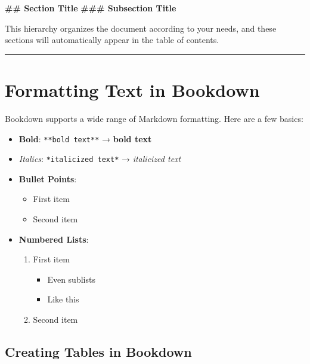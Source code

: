 \documentclass[
]{book}
\newenvironment{Shaded}{\begin{snugshade}}{\end{snugshade}}
\newcommand{\FunctionTok}[1]{\textcolor[rgb]{0.13,0.29,0.53}{\textbf{#1}}}
\providecommand{\tightlist}{%
  \setlength{\itemsep}{0pt}\setlength{\parskip}{0pt}}
\theoremstyle{definition}
\theoremstyle{definition}
\theoremstyle{definition}
\theoremstyle{definition}
\theoremstyle{remark}
\begin{document}
\begin{Shaded}
\begin{Highlighting}[]
\FunctionTok{\#\# Section Title}
\FunctionTok{\#\#\# Subsection Title}
\end{Highlighting}
\end{Shaded}

This hierarchy organizes the document according to your needs, and these sections will automatically appear in the table of contents.

\begin{center}\rule{0.5\linewidth}{0.5pt}\end{center}

\section{Formatting Text in Bookdown}\label{formatting-text-in-bookdown}

Bookdown supports a wide range of Markdown formatting. Here are a few basics:

\begin{itemize}
\tightlist
\item
  \textbf{Bold}: \texttt{**bold\ text**} → \textbf{bold text}
\item
  \emph{Italics}: \texttt{*italicized\ text*} → \emph{italicized text}
\item
  \textbf{Bullet Points}:

  \begin{itemize}
  \tightlist
  \item
    First item
  \item
    Second item
  \end{itemize}
\item
  \textbf{Numbered Lists}:

  \begin{enumerate}
  \def\labelenumi{\arabic{enumi}.}
  \tightlist
  \item
    First item

    \begin{itemize}
    \tightlist
    \item
      Even sublists
    \item
      Like this
    \end{itemize}
  \item
    Second item
  \end{enumerate}
\end{itemize}

\subsection{Creating Tables in Bookdown}\label{creating-tables-in-bookdown}
\end{document}
